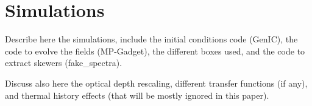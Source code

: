 \section{Simulations}
\label{sec:sims}

Describe here the simulations, include the initial conditions code (GenIC), 
the code to evolve the fields (MP-Gadget), the different boxes used, 
and the code to extract skewers (fake\_spectra).

Discuss also here the optical depth rescaling, different transfer functions
(if any), and thermal history effects (that will be mostly ignored in this
paper).


